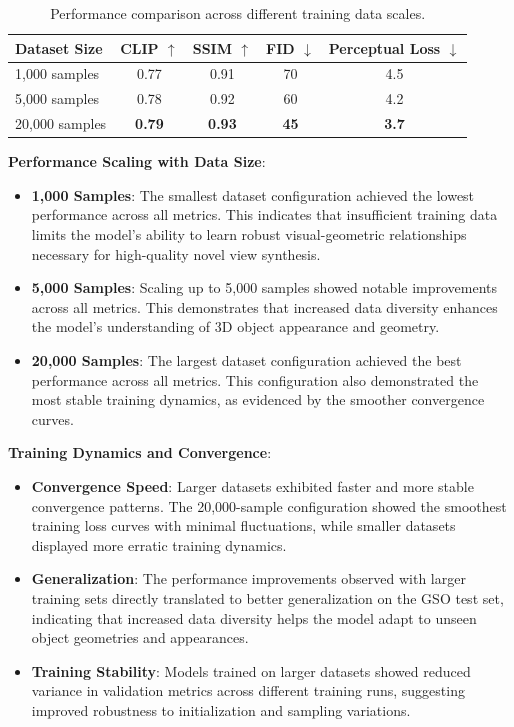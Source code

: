 \begin{table}[htbp]
  \centering
  \caption{Performance comparison across different training data scales.}
  \label{tab:data_scale_results}
  \begin{tabular}{lcccc}
    \toprule
    \textbf{Dataset Size} & \textbf{CLIP} $\uparrow$ & \textbf{SSIM} $\uparrow$ & \textbf{FID} $\downarrow$ & \textbf{Perceptual Loss} $\downarrow$ \\
    \midrule
    1,000 samples & 0.77 & 0.91 & 70 & 4.5 \\
    5,000 samples & 0.78 & 0.92 & 60 & 4.2 \\
    20,000 samples & \textbf{0.79} & \textbf{0.93} & \textbf{45} & \textbf{3.7} \\
    \bottomrule
  \end{tabular}
\end{table}

\textbf{Performance Scaling with Data Size}:
\begin{itemize}
  \item \textbf{1,000 Samples}: The smallest dataset configuration achieved the lowest performance across all metrics. This indicates that insufficient training data limits the model's ability to learn robust visual-geometric relationships necessary for high-quality novel view synthesis.

  \item \textbf{5,000 Samples}: Scaling up to 5,000 samples showed notable improvements across all metrics. This demonstrates that increased data diversity enhances the model's understanding of 3D object appearance and geometry.

  \item \textbf{20,000 Samples}: The largest dataset configuration achieved the best performance across all metrics. This configuration also demonstrated the most stable training dynamics, as evidenced by the smoother convergence curves.
\end{itemize}

\textbf{Training Dynamics and Convergence}:
\begin{itemize}
  \item \textbf{Convergence Speed}: Larger datasets exhibited faster and more stable convergence patterns. The 20,000-sample configuration showed the smoothest training loss curves with minimal fluctuations, while smaller datasets displayed more erratic training dynamics.
  \item \textbf{Generalization}: The performance improvements observed with larger training sets directly translated to better generalization on the GSO test set, indicating that increased data diversity helps the model adapt to unseen object geometries and appearances.
  \item \textbf{Training Stability}: Models trained on larger datasets showed reduced variance in validation metrics across different training runs, suggesting improved robustness to initialization and sampling variations.
\end{itemize}

